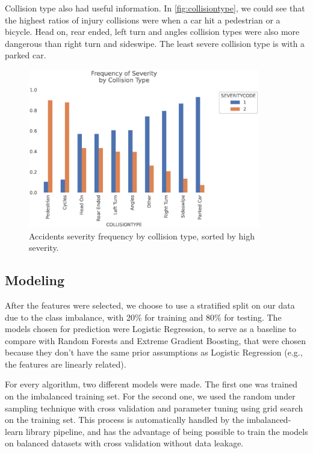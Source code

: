 \documentclass[12pt]{article}
\begin{document}
Collision type also had useful information. In \autoref{fig:collisiontype}, we could see that the highest ratios of injury collisions were when a car hit a pedestrian or a bicycle. Head on, rear ended, left turn and angles collision types were also more dangerous than right turn and sideswipe. The least severe collision type is with a parked car.
\begin{figure}
        \centering
        \includegraphics[width=0.9\textwidth]{plot_collisiontype.eps}
        \caption{Accidents severity frequency by collision type, sorted by high severity.\label{fig:collisiontype}}
\end{figure}

\subsection{Modeling}

After the features were selected, we choose to use a stratified split on our data due to the class imbalance, with 20\% for training and 80\% for testing. The models chosen for prediction were Logistic Regression, to serve as a baseline to compare with Random Forests and Extreme Gradient Boosting, that were chosen because they don’t have the same prior assumptions as Logistic Regression (e.g., the features are linearly related).

For every algorithm, two different models were made. The first one was trained on the imbalanced training set. For the second one, we used the random under sampling technique with cross validation and parameter tuning using grid search on the training set. This process is automatically handled by the imbalanced-learn library pipeline, and has the advantage of being possible to train the models on balanced datasets with cross validation without data leakage.
\end{document}
